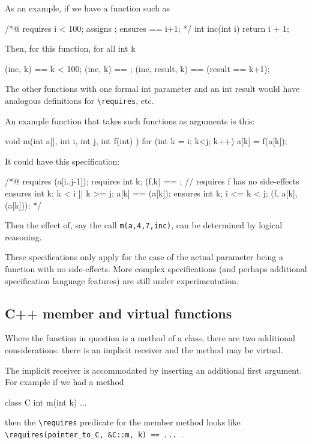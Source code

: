 As an example, if we have a function such as 
\begin{listing-nonumber}
/*@ requires i < 100;
       assigns \empty;
       ensures \result == i+1;
       */
int inc(int i) { return i + 1; }
\end{listing-nonumber}
Then, for this function, for all int k
\begin{listing-nonumber}
\requires(inc, k) == k < 100;
\assigns(inc, k) == \empty;
\ensures(inc, result, k) == (result == k+1);
\end{listing-nonumber}
The other functions with one formal int parameter and an int result would have analogous definitions for \lstinline|\requires|, etc.

An example function that takes such functions as arguments is this:
\begin{listing-nonumber}
void m(int a[], int i, int j, int f(int) ) {
  for (int k = i; k<j; k++) a[k] = f(a[k]);
}
\end{listing-nonumber}

It could have this specification:
\begin{listing-nonumber}
/*@
  requires \valid(a[i..j-1]);
  requires \forall int k; \assigns(f,k) == \empty;  // requires f has no side-effects
  ensures \forall int k; k < i || k >= j; a[k] == \old(a[k]);
  ensures \forall int k; i <= k < j; \ensures(f, a[k], \old(a[k]));
*/
\end{listing-nonumber}
Then the effect of, say the call \lstinline|m(a,4,7,inc)|, can be determined by logical reasoning.

These specifications only apply for the case of the actual parameter being a function with no side-effects. More complex specifications (and perhaps additional specification language features) are still under experimentation.

\subsection{C++ member and virtual functions}

Where the function in question is a method of a class, there are two additional considerations: there is an implicit receiver and the method may be virtual.

The implicit receiver is accommodated by inserting an additional first argument. For example if we had a method
\begin{listing-nonumber}
class C {
  int m(int k) { ... }
}
\end{listing-nonumber}
then the  \lstinline|\requires| predicate for the member method looks like \lstinline|\requires(pointer_to_C, &C::m, k) == ... |.

